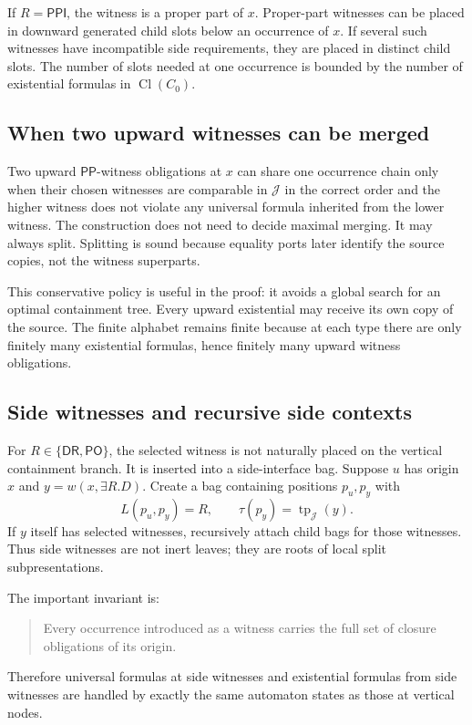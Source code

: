 \documentclass[11pt]{article}
\newcommand{\PP}{\mathsf{PP}}
\newcommand{\PPI}{\mathsf{PPI}}
\newcommand{\PO}{\mathsf{PO}}
\newcommand{\DR}{\mathsf{DR}}
\newcommand{\Cl}{\operatorname{Cl}}
\newcommand{\tp}{\operatorname{tp}}
\begin{document}
If $R=\PPI$, the witness is a proper part of $x$.  Proper-part witnesses can be placed in downward generated child slots below an occurrence of $x$.  If several such witnesses have incompatible side requirements, they are placed in distinct child slots.  The number of slots needed at one occurrence is bounded by the number of existential formulas in $\Cl(C_0)$.

\subsection{When two upward witnesses can be merged}

Two upward $\PP$-witness obligations at $x$ can share one occurrence chain only when their chosen witnesses are comparable in $\mathcal J$ in the correct order and the higher witness does not violate any universal formula inherited from the lower witness.  The construction does not need to decide maximal merging.  It may always split.  Splitting is sound because equality ports later identify the source copies, not the witness superparts.

This conservative policy is useful in the proof: it avoids a global search for an optimal containment tree.  Every upward existential may receive its own copy of the source.  The finite alphabet remains finite because at each type there are only finitely many existential formulas, hence finitely many upward witness obligations.

\subsection{Side witnesses and recursive side contexts}

For $R\in\{\DR,\PO\}$, the selected witness is not naturally placed on the vertical containment branch.  It is inserted into a side-interface bag.  Suppose $u$ has origin $x$ and $y=w(x,\exists R.D)$.  Create a bag containing positions $p_u,p_y$ with
\[
  L(p_u,p_y)=R,
  \qquad
  \tau(p_y)=\tp_{\mathcal J}(y).
\]
If $y$ itself has selected witnesses, recursively attach child bags for those witnesses.  Thus side witnesses are not inert leaves; they are roots of local split subpresentations.

The important invariant is:
\begin{quote}
Every occurrence introduced as a witness carries the full set of closure obligations of its origin.
\end{quote}
Therefore universal formulas at side witnesses and existential formulas from side witnesses are handled by exactly the same automaton states as those at vertical nodes.
\end{document}
